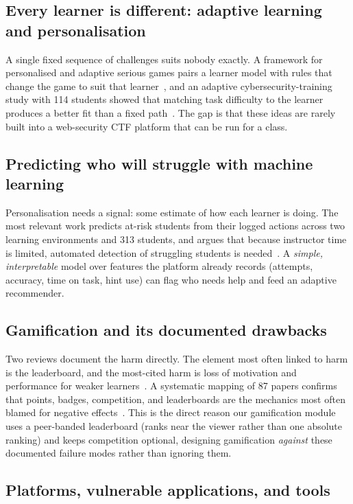 \subsection{Every learner is different: adaptive learning and personalisation}

A single fixed sequence of challenges suits nobody exactly. A framework for
personalised and adaptive serious games pairs a learner model with rules that change
the game to suit that learner~\cite{Streicher2016adaptive}, and an adaptive
cybersecurity-training study with 114 students showed that matching task difficulty
to the learner produces a better fit than a fixed path~\cite{Vykopal2022smart}. The
gap is that these ideas are rarely built into a web-security CTF platform that
can be run for a class.

\subsection{Predicting who will struggle with machine learning}

Personalisation needs a signal: some estimate of how each learner is doing. The most
relevant work predicts at-risk students from their logged actions across two
learning environments and 313 students, and argues that because instructor time is
limited, automated detection of struggling students is
needed~\cite{Svabensky2024detecting}. A \emph{simple, interpretable} model over
features the platform already records (attempts, accuracy, time on task, hint use)
can flag who needs help and feed an adaptive recommender.

\subsection{Gamification and its documented drawbacks}

Two reviews document the harm directly. The element most often linked to harm is the
leaderboard, and the most-cited harm is loss of motivation and performance for
weaker learners~\cite{Toda2018dark}. A systematic mapping of 87 papers confirms that
points, badges, competition, and leaderboards are the mechanics most often blamed
for negative effects~\cite{Almeida2023negative}. This is the direct reason our
gamification module uses a peer-banded leaderboard (ranks near the viewer rather
than one absolute ranking) and keeps competition optional, designing gamification
\emph{against} these documented failure modes rather than ignoring them.

\subsection{Platforms, vulnerable applications, and tools}

